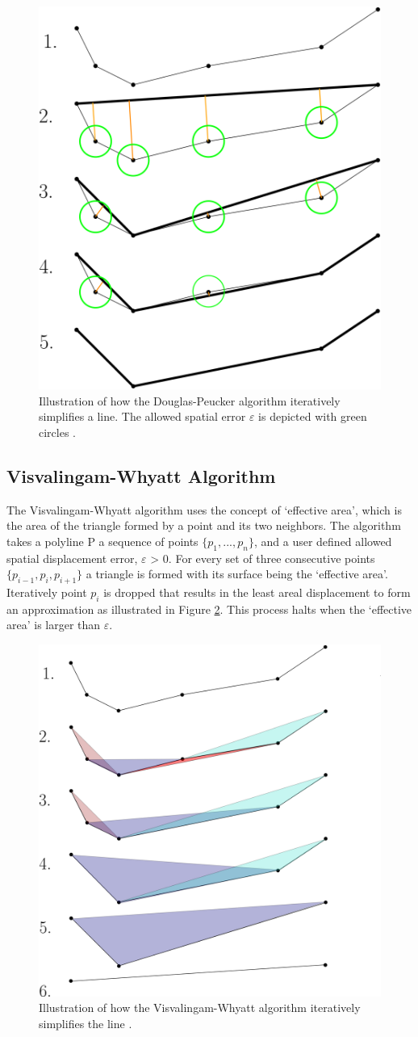 \documentclass[twoside,12pt, a4paper]{report}
\begin{document}
\begin{figure}[!h]
    \centering
    \includegraphics[width=0.5\linewidth]{figures/dgpk.png}
    \caption{Illustration of how the Douglas-Peucker algorithm
iteratively simplifies a line. The allowed spatial
error  $\varepsilon$  is depicted with green circles \cite{van2017extensive}. }
    \label{fig:dgpk}
\end{figure}

\subsection{Visvalingam-Whyatt Algorithm}

The Visvalingam-Whyatt algorithm \cite{doi:10.1179/000870493786962263} uses the concept
of ‘effective area’, which is the area of the triangle
formed by a point and its two neighbors. The algorithm
takes a polyline P a sequence of points $\{p_{1},..., p_{n}\}$, and
a user defined allowed spatial displacement error, $\varepsilon$ > 0.
For every set of three consecutive points $\{p_{i-1},p_{i},p_{i+1}\}$
a triangle is formed with its surface being the ‘effective area’. Iteratively point $p_{i}$ is dropped that results in
the least areal displacement to form an approximation
as illustrated in Figure \ref{fig:visv}. This process halts when the
‘effective area’ is larger than $\varepsilon$.

\begin{figure}[!h]
    \centering
    \includegraphics[width=0.5\linewidth]{figures/visv.png}
    \caption{Illustration of how the Visvalingam-Whyatt
algorithm iteratively simplifies the line \cite{van2017extensive}.}
    \label{fig:visv}
\end{figure}
\newpage
\end{document}
